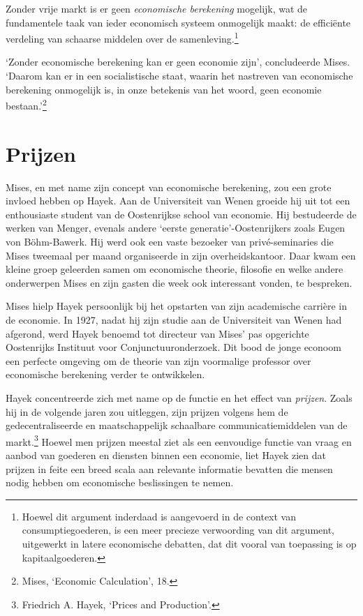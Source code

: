 \documentclass[smalldemyvopaper,11pt,twoside,onecolumn,openright,extrafontsizes,hidelinks]{memoir}
\begin{document}
Zonder vrije markt is er geen \emph{economische berekening} mogelijk,
wat de fundamentele taak van ieder economisch systeem onmogelijk maakt:
de efficiënte verdeling van schaarse middelen over de
samenleving.\footnote{Hoewel dit argument inderdaad is aangevoerd in de
  context van consumptiegoederen, is een meer precieze verwoording van
  dit argument, uitgewerkt in latere economische debatten, dat dit
  vooral van toepassing is op kapitaalgoederen.}

`Zonder economische berekening kan er geen economie zijn', concludeerde
Mises. `Daarom kan er in een socialistische staat, waarin het nastreven
van economische berekening onmogelijk is, in onze betekenis van het
woord, geen economie bestaan.'\footnote{\hspace{0pt}Mises, `Economic
  Calculation', 18.}

\section{Prijzen}\label{prijzen}

Mises, en met name zijn concept van economische berekening, zou een
grote invloed hebben op Hayek. Aan de Universiteit van Wenen groeide hij
uit tot een enthousiaste student van de Oostenrijkse school van
economie. Hij bestudeerde de werken van Menger, evenals andere `eerste
generatie'-Oostenrijkers zoals Eugen von Böhm-Bawerk. Hij werd ook een
vaste bezoeker van privé-seminaries die Mises tweemaal per maand
organiseerde in zijn overheidskantoor. Daar kwam een kleine groep
geleerden samen om economische theorie, filosofie en welke andere
onderwerpen Mises en zijn gasten die week ook interessant vonden, te
bespreken.

Mises hielp Hayek persoonlijk bij het opstarten van zijn academische
carrière in de economie. In 1927, nadat hij zijn studie aan de
Universiteit van Wenen had afgerond, werd Hayek benoemd tot directeur
van Mises' pas opgerichte Oostenrijks Instituut voor
Conjunctuuronderzoek. Dit bood de jonge econoom een perfecte omgeving om
de theorie van zijn voormalige professor over economische berekening
verder te ontwikkelen.

Hayek concentreerde zich met name op de functie en het effect van
\emph{prijzen}. Zoals hij in de volgende jaren zou uitleggen, zijn
prijzen volgens hem de gedecentraliseerde en maatschappelijk schaalbare
communicatiemiddelen van de markt.\footnote{Friedrich A. Hayek, `Prices
  and Production'.} Hoewel men prijzen meestal ziet als een eenvoudige
functie van vraag en aanbod van goederen en diensten binnen een
economie, liet Hayek zien dat prijzen in feite een breed scala aan
relevante informatie bevatten die mensen nodig hebben om economische
beslissingen te nemen.
\end{document}
